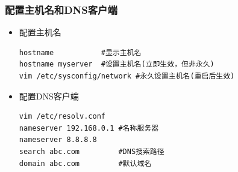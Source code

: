 \documentclass[xcolor=svgnames,presentation]{beamer}
\begin{document}
\begin{frame}[fragile]
\frametitle{配置主机名和DNS客户端}
\label{sec-1-5}
\begin{itemize}

\item 配置主机名\\
\label{sec-1-5-1}%
\begin{verbatim}
hostname           #显示主机名
hostname myserver  #设置主机名(立即生效，但非永久)
vim /etc/sysconfig/network #永久设置主机名(重启后生效)
\end{verbatim}


\item 配置DNS客户端\\
\label{sec-1-5-2}%
\begin{verbatim}
vim /etc/resolv.conf
nameserver 192.168.0.1 #名称服务器
nameserver 8.8.8.8
search abc.com         #DNS搜索路径
domain abc.com         #默认域名
\end{verbatim}

\end{itemize} %
\end{frame}
\end{document}
